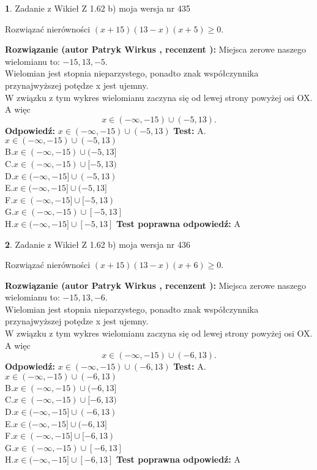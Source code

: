 \documentclass[12pt, a4paper]{article}
\theoremstyle{definition} %
\newtheorem{zad}{}
\newcommand{\zadStart}[1]{\begin{zad}#1\newline}
\newcommand{\zadStop}{\end{zad}}
\newcommand{\rozwStart}[2]{\noindent \textbf{Rozwiązanie (autor #1 , recenzent #2): }\newline}
\newcommand{\rozwStop}{\newline}
\newcommand{\odpStart}{\noindent \textbf{Odpowiedź:}\newline}
\newcommand{\odpStop}{\newline}
\newcommand{\testStart}{\noindent \textbf{Test:}\newline}
\newcommand{\testStop}{\newline}
\newcommand{\kluczStart}{\noindent \textbf{Test poprawna odpowiedź:}\newline}
\newcommand{\kluczStop}{\newline}
\begin{document}
\zadStart{Zadanie z Wikieł Z 1.62 b) moja wersja nr 435}

Rozwiązać nierówności $(x+15)(13-x)(x+5)\ge0$.
\zadStop
\rozwStart{Patryk Wirkus}{}
Miejsca zerowe naszego wielomianu to: $-15, 13, -5$.\\
Wielomian jest stopnia nieparzystego, ponadto znak współczynnika przy\linebreak najwyższej potędze x jest ujemny.\\ W związku z tym wykres wielomianu zaczyna się od lewej strony powyżej osi OX. A więc $$x \in (-\infty,-15) \cup (-5,13).$$
\rozwStop
\odpStart
$x \in (-\infty,-15) \cup (-5,13)$
\odpStop
\testStart
A.$x \in (-\infty,-15) \cup (-5,13)$\\
B.$x \in (-\infty,-15) \cup (-5,13]$\\
C.$x \in (-\infty,-15) \cup [-5,13)$\\
D.$x \in (-\infty,-15] \cup (-5,13)$\\
E.$x \in (-\infty,-15] \cup (-5,13]$\\
F.$x \in (-\infty,-15] \cup [-5,13)$\\
G.$x \in (-\infty,-15) \cup [-5,13]$\\
H.$x \in (-\infty,-15] \cup [-5,13]$
\testStop
\kluczStart
A
\kluczStop



\zadStart{Zadanie z Wikieł Z 1.62 b) moja wersja nr 436}

Rozwiązać nierówności $(x+15)(13-x)(x+6)\ge0$.
\zadStop
\rozwStart{Patryk Wirkus}{}
Miejsca zerowe naszego wielomianu to: $-15, 13, -6$.\\
Wielomian jest stopnia nieparzystego, ponadto znak współczynnika przy\linebreak najwyższej potędze x jest ujemny.\\ W związku z tym wykres wielomianu zaczyna się od lewej strony powyżej osi OX. A więc $$x \in (-\infty,-15) \cup (-6,13).$$
\rozwStop
\odpStart
$x \in (-\infty,-15) \cup (-6,13)$
\odpStop
\testStart
A.$x \in (-\infty,-15) \cup (-6,13)$\\
B.$x \in (-\infty,-15) \cup (-6,13]$\\
C.$x \in (-\infty,-15) \cup [-6,13)$\\
D.$x \in (-\infty,-15] \cup (-6,13)$\\
E.$x \in (-\infty,-15] \cup (-6,13]$\\
F.$x \in (-\infty,-15] \cup [-6,13)$\\
G.$x \in (-\infty,-15) \cup [-6,13]$\\
H.$x \in (-\infty,-15] \cup [-6,13]$
\testStop
\kluczStart
A
\kluczStop
\end{document}
